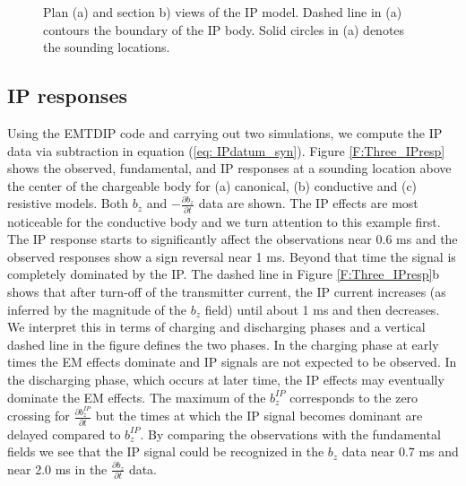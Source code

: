 \documentclass[extra,mreferee]{gji}
\begin{document}
\begin{figure}
  \caption{Plan (a) and section b) views of the IP model. Dashed line in (a) contours the boundary of the IP body. Solid circles in (a) denotes the sounding locations.}
  \label{F: IPModel}
\end{figure}
\clearpage

\subsection{IP responses}
Using the  EMTDIP code and carrying out two simulations, we compute the IP data via subtraction in equation (\ref{eq: IPdatum_syn}).
Figure \ref{F:Three_IPresp} shows the observed, fundamental, and IP responses at a sounding location above the center of the chargeable body for (a) canonical, (b) conductive and (c) resistive models. Both $b_z$ and $-\frac{\partial b_z}{\partial t}$ data are shown. 
The IP effects are most noticeable for the conductive body and we turn attention to this example first. The IP response starts to significantly affect the observations near 0.6 ms and the observed responses show a sign reversal near 1 ms. Beyond that time the signal is completely dominated by the IP. The dashed line in Figure \ref{F:Three_IPresp}b shows that after turn-off of the transmitter current, the IP current increases (as inferred by the magnitude of the $b_z$ field) until about 1 ms and then decreases. We interpret this in terms of charging and discharging phases and a vertical dashed line in the figure defines the two phases. In the charging phase at early times the EM effects dominate and IP signals are not expected to be observed. In the discharging phase, which occurs at  later time, the IP effects may eventually dominate the EM effects. The maximum of the $b_z^{IP}$ corresponds to the zero crossing for $\frac{\partial b_z^{IP}}{\partial t}$ but the times at which the IP signal becomes dominant are delayed compared to $b_z^{IP}$. By comparing the observations with the fundamental fields we see that the IP signal could be recognized in the $b_z$ data near 0.7 ms and near 2.0 ms in the $\frac{\partial b_z}{\partial t}$ data.
\end{document}
